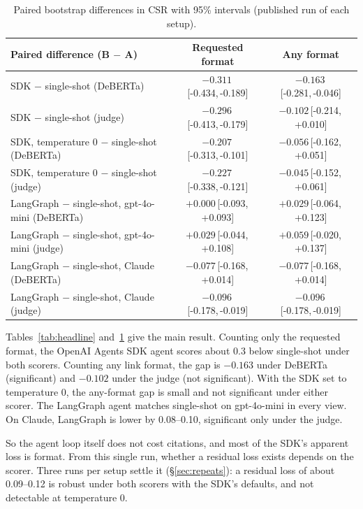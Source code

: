 \documentclass[11pt]{article}
\newcommand{\ci}[2]{\,[#1,\,#2]}
\begin{document}
\begin{table}[t]
\centering
\small
\begin{tabular}{lcc}
\toprule
Paired difference (B $-$ A) & Requested format & Any format \\
\midrule
SDK $-$ single-shot (DeBERTa) & $-0.311$\ci{-0.434}{-0.189} & $-0.163$\ci{-0.281}{-0.046} \\
SDK $-$ single-shot (judge) & $-0.296$\ci{-0.413}{-0.179} & $-0.102$\ci{-0.214}{+0.010} \\
SDK, temperature 0 $-$ single-shot (DeBERTa) & $-0.207$\ci{-0.313}{-0.101} & $-0.056$\ci{-0.162}{+0.051} \\
SDK, temperature 0 $-$ single-shot (judge) & $-0.227$\ci{-0.338}{-0.121} & $-0.045$\ci{-0.152}{+0.061} \\
LangGraph $-$ single-shot, gpt-4o-mini (DeBERTa) & $+0.000$\ci{-0.093}{+0.093} & $+0.029$\ci{-0.064}{+0.123} \\
LangGraph $-$ single-shot, gpt-4o-mini (judge) & $+0.029$\ci{-0.044}{+0.108} & $+0.059$\ci{-0.020}{+0.137} \\
LangGraph $-$ single-shot, Claude (DeBERTa) & $-0.077$\ci{-0.168}{+0.014} & $-0.077$\ci{-0.168}{+0.014} \\
LangGraph $-$ single-shot, Claude (judge) & $-0.096$\ci{-0.178}{-0.019} & $-0.096$\ci{-0.178}{-0.019} \\
\bottomrule
\end{tabular}
\caption{Paired bootstrap differences in CSR with 95\% intervals (published run of each setup).}
\label{tab:paired}
\end{table}

Tables~\ref{tab:headline} and~\ref{tab:paired} give the main result. Counting only the requested
format, the OpenAI Agents SDK agent scores about 0.3 below single-shot under both scorers. Counting
any link format, the gap is $-0.163$ under DeBERTa (significant) and $-0.102$ under the judge (not
significant). With the SDK set to temperature 0, the any-format gap is small and not significant
under either scorer. The LangGraph agent matches single-shot on gpt-4o-mini in every view. On
Claude, LangGraph is lower by 0.08--0.10, significant only under the judge.

So the agent loop itself does not cost citations, and most of the SDK's apparent loss is format.
From this single run, whether a residual loss exists depends on the scorer. Three runs per setup
settle it (\S\ref{sec:repeats}): a residual loss of about 0.09--0.12 is robust under both scorers
with the SDK's defaults, and not detectable at temperature 0.
\end{document}
